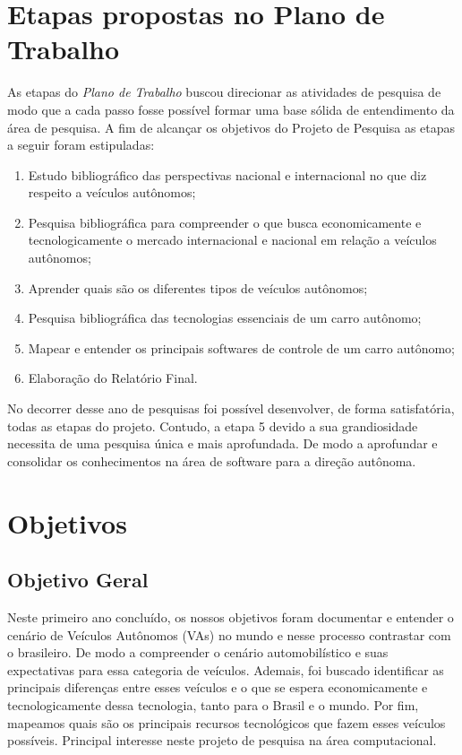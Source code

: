 
\chapter{Etapas propostas no Plano de Trabalho} \label{Etapas}
As etapas do \textit{Plano de Trabalho} buscou direcionar as atividades de pesquisa de modo que a cada passo fosse possível formar uma base sólida de entendimento da área de pesquisa. A fim de alcançar os objetivos do Projeto de Pesquisa as etapas a seguir foram estipuladas:
\begin{enumerate}
    \item  Estudo bibliográfico das perspectivas nacional e internacional no que diz respeito a veículos autônomos;
    \item  Pesquisa bibliográfica para compreender o que busca economicamente e tecnologicamente o mercado internacional e nacional em relação a veículos autônomos;
    \item Aprender quais são os diferentes tipos de veículos autônomos;
    \item Pesquisa bibliográfica das tecnologias essenciais de um carro autônomo;
    \item Mapear e entender os principais softwares de controle de um carro autônomo;
    \item Elaboração do Relatório Final.
\end{enumerate}

No decorrer desse ano de pesquisas foi possível desenvolver, de forma satisfatória, todas as etapas do projeto. Contudo, a etapa 5 devido a sua grandiosidade necessita de uma pesquisa única e mais aprofundada. De modo a aprofundar e consolidar os conhecimentos na área de software para a direção autônoma.

\newpage
\chapter{Objetivos} \label{Objetivos}
\section{Objetivo Geral}\label{Objetivo Geral}
Neste primeiro ano concluído, os nossos objetivos foram documentar e entender o cenário de Veículos Autônomos (VAs) no mundo e nesse processo contrastar com o brasileiro. De modo a compreender o cenário automobilístico e suas expectativas para essa categoria de veículos. Ademais, foi buscado identificar as principais diferenças entre esses veículos e o que se espera economicamente e tecnologicamente dessa tecnologia, tanto para o Brasil e o mundo. Por fim, mapeamos quais são os principais recursos tecnológicos que fazem esses veículos possíveis. Principal interesse neste projeto de pesquisa na área computacional. 


